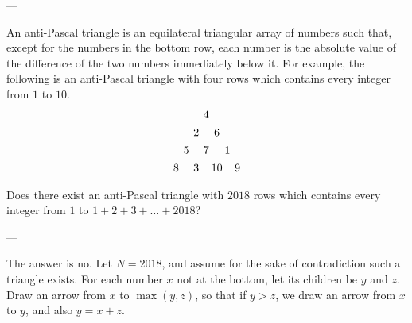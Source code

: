 
---

An anti-Pascal triangle is an equilateral triangular array of numbers such that, except for the numbers in the bottom row, each number is the absolute value of the difference of the two numbers immediately below it. For example, the following is an anti-Pascal triangle with four rows which contains every integer from $1$ to $10$.
\[\begin{array}{
            c@{\hspace{4pt}}c@{\hspace{4pt}}
            c@{\hspace{4pt}}c@{\hspace{2pt}}c@{\hspace{2pt}}c@{\hspace{4pt}}c
        } \vspace{4pt}
        & & & 4 & & &  \\\vspace{4pt}
        & & 2 & & 6 & &  \\\vspace{4pt}
        & 5 & & 7 & & 1 & \\\vspace{4pt}
        8 & & 3 & & 10 & & 9
\end{array}\]
Does there exist an anti-Pascal triangle with $2018$ rows which contains every integer from $1$ to $1+2+3+\ldots+2018$?

---

The answer is no. Let $N=2018$, and assume for the sake of contradiction such a triangle exists. For each number $x$ not at the bottom, let its children be $y$ and $z$. Draw an arrow from $x$ to $\max(y,z)$, so that if $y>z$, we draw an arrow from $x$ to $y$, and also $y=x+z$.

